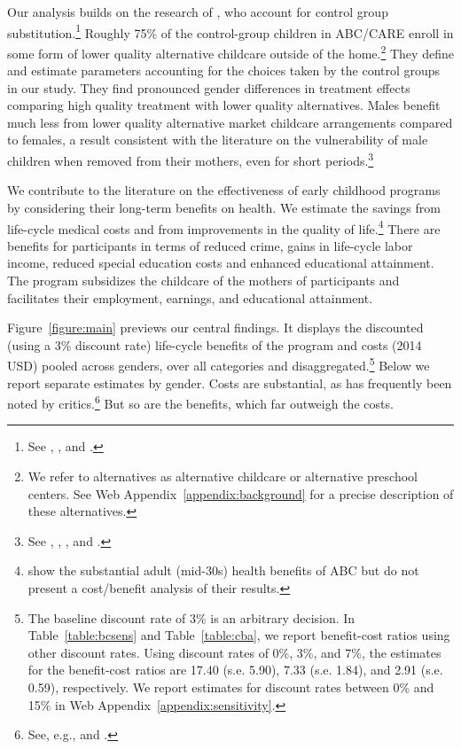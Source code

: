 Our analysis builds on the research of \cite{Garcia_Ziff_2017_Gender-Diff_UNPUBLISHED}, who account for control group substitution.\footnote{See \cite{Heckman_1992_randomization}, \cite{Heckman_Hohmann_etal_2000_QJE}, and \cite{Kline_Walters_2016_QJE}.} Roughly 75\% of the control-group children in ABC/CARE enroll in some form of lower quality alternative childcare outside of the home.\footnote{We refer to alternatives as alternative childcare or alternative preschool centers. See Web Appendix~\ref{appendix:background} for a precise description of these alternatives.} They define and estimate parameters accounting for the choices taken by the control groups in our study. They find pronounced gender differences in treatment effects comparing high quality treatment with lower quality alternatives. Males benefit much less from lower quality alternative market childcare arrangements compared to females, a result consistent with the literature on the vulnerability of male children when removed from their mothers, even for short periods.\footnote{See \citet{Kottelenberg-Lehrer_2014_Gender-Effects}, \citet{Baker_Gruber_Milligan_2015_Noncog_Defects}, \cite{Schore_2017_IMHJ}, and \cite{Garcia_Ziff_2017_Gender-Diff_UNPUBLISHED}.}

We contribute to the literature on the effectiveness of early childhood programs by considering their long-term benefits on health. We estimate the savings from life-cycle medical costs and from improvements in the quality of life.\footnote{\cite{Campbell_Conti_etal_2014_EarlyChildhoodInvestments} show the substantial adult (mid-30s) health benefits of ABC but do not present a cost/benefit analysis of their results.} There are benefits for participants in terms of reduced crime, gains in life-cycle labor income, reduced special education costs and enhanced educational attainment. The program subsidizes the childcare of the mothers of participants and facilitates their employment, earnings, and educational attainment.

Figure~\ref{figure:main} previews our central findings. It displays the discounted (using a 3\% discount rate) life-cycle benefits of the program and costs (2014 USD) pooled across genders, over all categories and disaggregated.\footnote{The baseline discount rate of 3\% is an arbitrary decision. In Table~\ref{table:bcsens} and Table~\ref{table:cba}, we report benefit-cost ratios using other discount rates. Using discount rates of 0\%, 3\%, and 7\%, the estimates for the benefit-cost ratios are 17.40 (s.e. 5.90), 7.33 (s.e. 1.84), and 2.91 (s.e. 0.59), respectively. We report estimates for discount rates between 0\% and 15\% in Web Appendix~\ref{appendix:sensitivity}.} Below we report separate estimates by gender. Costs are substantial, as has frequently been noted by critics.\footnote{See, e.g., \citet{Whitehurst_2014_Senate_Testimony} and \citet{Fox_News_2014_Head_Start_Effects}.} But so are the benefits, which far outweigh the costs.

